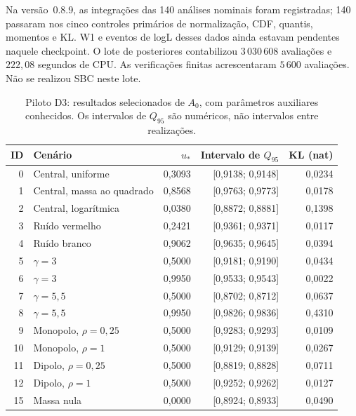 Na versão~0.8.9, as integrações das 140 análises nominais foram registradas;
140 passaram nos cinco controles primários de normalização, CDF,
quantis, momentos e KL. W1 e eventos de logL desses dados ainda estavam pendentes naquele checkpoint.
O lote de posteriores contabilizou \(3\,030\,608\) avaliações e
\(222,08\) segundos de CPU. As verificações finitas acrescentaram
\(5\,600\) avaliações. Não se realizou SBC neste lote.
\begin{table}[htbp]\centering\small
\caption{Piloto D3: resultados selecionados de \(A_0\), com parâmetros auxiliares conhecidos. Os intervalos de \(Q_{95}\) são numéricos, não intervalos entre realizações.}
\label{tab:c09-d3-piloto}
\begin{tabular}{rlrrr}\toprule
ID & Cenário & \(u_*\) & Intervalo de \(Q_{95}\) & KL (nat) \\ \midrule
0 & Central, uniforme & 0,3093 & [0,9138; 0,9148] & 0,0234 \\
1 & Central, massa ao quadrado & 0,8568 & [0,9763; 0,9773] & 0,0178 \\
2 & Central, logarítmica & 0,0380 & [0,8872; 0,8881] & 0,1398 \\
3 & Ruído vermelho & 0,2421 & [0,9361; 0,9371] & 0,0117 \\
4 & Ruído branco & 0,9062 & [0,9635; 0,9645] & 0,0394 \\
5 & \(\gamma=3\) & 0,5000 & [0,9181; 0,9190] & 0,0434 \\
6 & \(\gamma=3\) & 0,9950 & [0,9533; 0,9543] & 0,0022 \\
7 & \(\gamma=5,5\) & 0,5000 & [0,8702; 0,8712] & 0,0637 \\
8 & \(\gamma=5,5\) & 0,9950 & [0,9826; 0,9836] & 0,4310 \\
9 & Monopolo, \(\rho=0,25\) & 0,5000 & [0,9283; 0,9293] & 0,0109 \\
10 & Monopolo, \(\rho=1\) & 0,5000 & [0,9129; 0,9139] & 0,0267 \\
11 & Dipolo, \(\rho=0,25\) & 0,5000 & [0,8819; 0,8828] & 0,0711 \\
12 & Dipolo, \(\rho=1\) & 0,5000 & [0,9252; 0,9262] & 0,0127 \\
15 & Massa nula & 0,0000 & [0,8924; 0,8933] & 0,0490 \\
\bottomrule\end{tabular}
\end{table}
